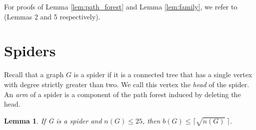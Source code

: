 \documentclass[12pt]{article}
\newtheorem{lemma}[theorem]{Lemma}
\begin{document}
For proofs of Lemma \ref{lem:path_forest} and Lemma \ref{lem:family}, we refer to \cite{burning_spiders} (Lemmas 2 and 5 respectively).

\section{Spiders}
Recall that a graph $G$ is a spider if it is a connected tree that has a single vertex with degree strictly greater than two.
We call this vertex the \textit{head} of the spider.
An \textit{arm} of a spider is a component of the path forest induced by deleting the head.

\begin{lemma} \label{lem:small_spiders}
    If G is a spider and $n(G) \leq 25$, then $b(G) \leq \lceil \sqrt{n(G)}\ \rceil$.
\end{lemma}
\end{document}

